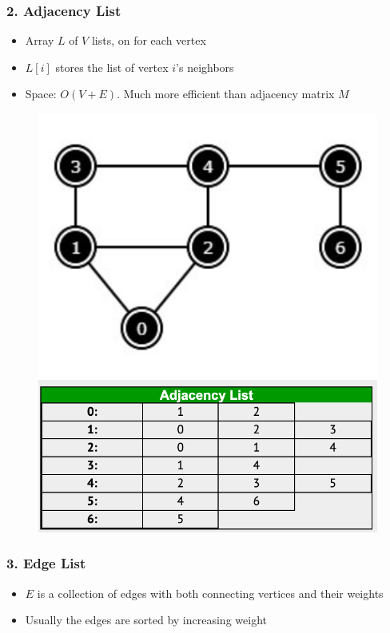 \documentclass{beamer}
\begin{document}
\begin{frame}[fragile]
\frametitle{2. Adjacency List}
	\begin{itemize}
	    \item Array $L$ of $V$ lists, on for each vertex
	    \item $L[i]$ stores the list of vertex $i$'s neighbors
	    \item Space: $O(V+E)$. Much more efficient than adjacency matrix $M$
	\end{itemize}
	\begin{figure}
	    \centering
	    \includegraphics[scale=0.45]{imgs/2.4/graph/graph.png}
	    \hspace{0.4cm}
	    \includegraphics[scale=0.4]{imgs/2.4/graph/adjacency-list.png}	    
	\end{figure}
\end{frame}

\begin{frame}[fragile]
\frametitle{3. Edge List}
	\begin{itemize}
	    \item $E$ is a collection of edges with both connecting vertices and their weights
	    \item Usually the edges are sorted by increasing weight
	\end{itemize}
\end{frame}
\end{document}
